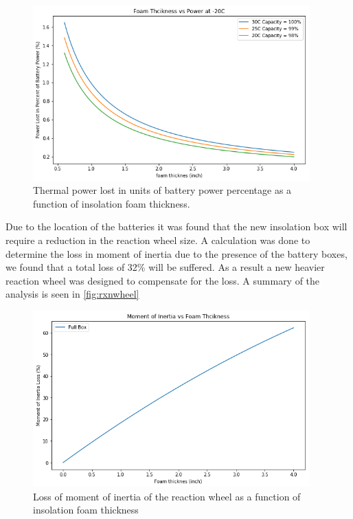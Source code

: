 \begin{figure}
    \begin{small}
        \begin{center}
            \includegraphics[width=0.95\textwidth]{Hardware/figs/battery_power_loss.png}
        \end{center}
        \caption{Thermal power lost in units of battery power percentage as a function of insolation foam thickness.}
        \label{fig:power loss}
    \end{small}
\end{figure}

\par
Due to the location of the batteries it was found that the new insolation box will require a reduction in the reaction wheel size. A calculation was done to determine the loss in moment of inertia due to the presence of the battery boxes, we found that a total loss of 32\% will be suffered. As a result a new heavier reaction wheel was designed to compensate for the loss. A summary of the analysis is seen in \autoref{fig:rxnwheel}

\begin{figure}
    \begin{small}
        \begin{center}
            \includegraphics[width=0.95\textwidth]{Hardware/figs/battery_inertia_loss.png}
        \end{center}
        \caption{Loss of moment of inertia of the reaction wheel as a function of insolation foam thickness}
        \label{fig:rxnwheel}
    \end{small}
\end{figure}

